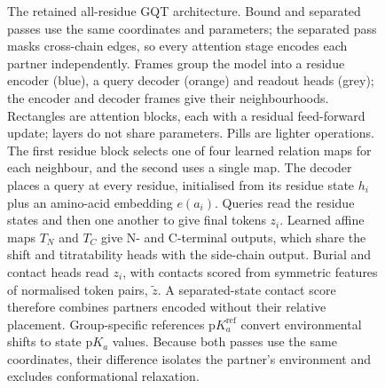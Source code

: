 \begin{figure}[tbp]
    \caption[Shared GQT encoder and query decoder]{The retained all-residue GQT architecture. Bound and separated passes use the same coordinates and parameters; the separated pass masks cross-chain edges, so every attention stage encodes each partner independently. Frames group the model into a residue encoder (blue), a query decoder (orange) and readout heads (grey); the encoder and decoder frames give their neighbourhoods. Rectangles are attention blocks, each with a residual feed-forward update; layers do not share parameters. Pills are lighter operations. The first residue block selects one of four learned relation maps for each neighbour, and the second uses a single map. The decoder places a query at every residue, initialised from its residue state $h_i$ plus an amino-acid embedding $e(a_i)$. Queries read the residue states and then one another to give final tokens $z_i$. Learned affine maps $T_N$ and $T_C$ give N- and C-terminal outputs, which share the shift and titratability heads with the side-chain output. Burial and contact heads read $z_i$, with contacts scored from symmetric features of normalised token pairs, $\tilde z$. A separated-state contact score therefore combines partners encoded without their relative placement. Group-specific references $\mathrm{p}K_a^{\mathrm{ref}}$ convert environmental shifts to state $\mathrm{p}K_a$ values. Because both passes use the same coordinates, their difference isolates the partner's environment and excludes conformational relaxation.}
    \label{fig:jaxka-model-overview}
\end{figure}
